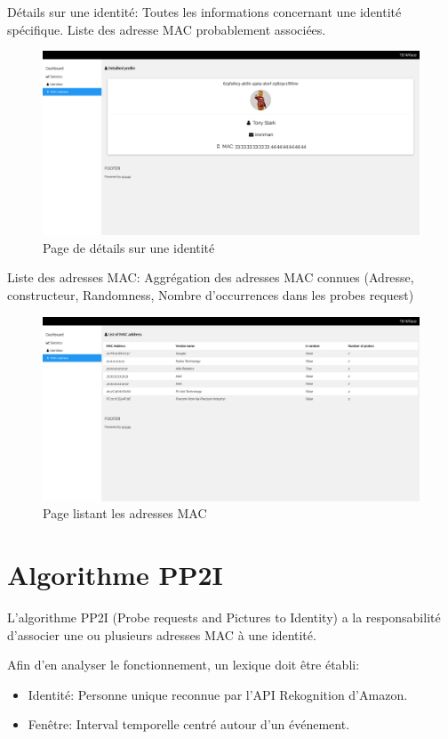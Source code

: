 Détails sur une identité: Toutes les informations concernant une identité spécifique. Liste des adresse MAC probablement associées. 
\begin{figure}[H]
	\centering
	\includegraphics[width=16cm]{images/dashboard/identity.png}
	\caption{Page de détails sur une identité}
	\label{fig:dashboard_stats}
\end{figure}

Liste des adresses MAC: Aggrégation des adresses MAC connues (Adresse, constructeur, Randomness, Nombre d'occurrences dans les probes request)
\begin{figure}[H]
	\centering
	\includegraphics[width=16cm]{images/dashboard/list-macs.png}
	\caption{Page listant les adresses MAC}
	\label{fig:dashboard_stats}
\end{figure}

\section{Algorithme PP2I}
L'algorithme PP2I (Probe requests and Pictures to Identity) a la responsabilité d'associer une ou plusieurs adresses MAC à une identité. 

Afin d'en analyser le fonctionnement, un lexique doit être établi:
\begin{itemize}
	\item Identité: Personne unique reconnue par l'API Rekognition d'Amazon.
	\item Fenêtre: Interval temporelle centré autour d'un événement. 
\end{itemize}

